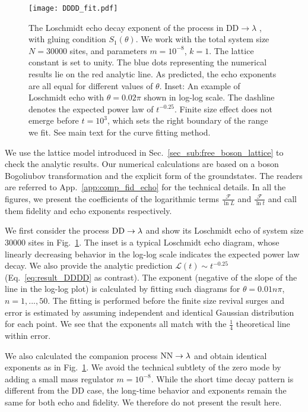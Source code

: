 \begin{figure}[h]
\texttt{[image: DDDD\_fit.pdf]}
\caption{The Loschmidt echo decay exponent of the process in $\text{DD}\rightarrow \lambda$ {\iffalse \color{red}Eq.~\eqref{eq:DDDD}\fi}, with gluing condition $S_1(\theta)$. We work with the total system size $N = 30000$ sites, and parameters $m = 10^{-8}$, $k = 1$. The lattice constant is set to unity. The blue dots representing the numerical results lie on the red analytic line. As predicted, the echo exponents are all equal for different values of $\theta$. Inset: An example of Loschmidt echo with $\theta = 0.02 \pi$ shown in log-log scale. The dashline denotes the expected power law of $t^{-0.25}$. Finite size effect does not emerge before $t=10^{3}$, which sets the right boundary of the range we fit. See main text for the curve fitting method.}
\label{fig:DDDD}
\end{figure}

We use the lattice model introduced in Sec.~\ref{sec_sub:free_boson_lattice} to check the analytic results. Our numerical calculations are based on a boson Bogoliubov transformation and the explicit form of the groundstates. The readers are referred to App.~\ref{app:comp_fid_echo} for the technical details. In all the figures, we present the coefficients of the logarithmic terms $\frac{\mathcal{F}}{\ln L}$ and $\frac{\mathcal{F} }{\ln t}$ and call them fidelity and echo exponents respectively. 

We first consider the process ${\rm DD} \rightarrow \lambda$
and show its Loschmidt echo of system size 30000 sites in Fig.~\ref{fig:DDDD}. The inset is a typical Loschmidt echo diagram, whose linearly decreasing behavior in the log-log scale indicates the expected power law decay. We also provide the analytic prediction $\mathcal{L}(t)\sim t^{-0.25}$ (\cf Eq.~\eqref{eq:result_DDDD} as contrast). The exponent (negative of the slope of the line in the log-log plot) is calculated by fitting such diagrams for $\theta = 0.01n \pi$, $n = 1,...,50 $. The fitting is performed before the finite size revival surges and error is estimated by assuming independent and identical Gaussian distribution for each point. We see that the exponents all match with the $\frac{1}{4}$ theoretical line within error. 

We also calculated the companion process ${\rm NN} \rightarrow \lambda$ and obtain identical exponents as in Fig.~\ref{fig:DDDD}. We avoid the technical subtlety of the zero mode by adding a small mass regulator $m=10^{-8}$. While the short time decay pattern is different from the DD case, the long-time behavior and exponents remain the same for both echo and fidelity. We therefore do not present the result here. 

